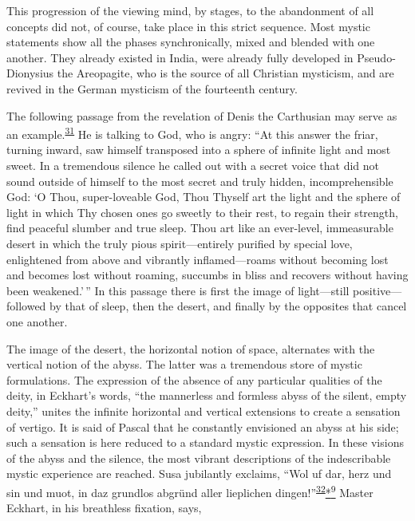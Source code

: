 This progression of the viewing mind, by stages, to the abandonment of
all concepts did not, of course, take place in this strict sequence.
Most mystic statements show all the phases synchronically, mixed and
blended with one another. They already existed in India, were already
fully developed in Pseudo-Dionysius the Areopagite, who is the source of
all Christian mysticism, and are revived in the German mysticism of the
fourteenth century.

The following passage from the revelation of Denis the Carthusian may
serve as an
example.\textsuperscript{\protect\hypertarget{17_Chapter_Ten__THE_FAILURE_OF_IMAG.xhtmlux5cux23id_674}{\protect\hyperlink{23_NOTES.xhtmlux5cux23id_675}{31}}}
He is talking to God, who is angry: ``At this answer the friar, turning
inward, saw himself transposed into a sphere of infinite light and most
sweet. In a tremendous silence he called out with a secret voice that
did not sound outside of himself to the most secret and truly hidden,
incomprehensible God: `O Thou, super-loveable God, Thou Thyself art the
light and the sphere of light in which Thy chosen ones go sweetly to
their rest, to regain their strength, find peaceful slumber and true
sleep. Thou art like an ever-level, immeasurable desert in which the
truly pious spirit---entirely purified by special love, enlightened from
above and vibrantly inflamed---roams without becoming lost and becomes
lost without roaming, succumbs in bliss and recovers without having been
weakened.'\,'' In this passage there is first the image of light---still
positive---followed by that of sleep, then the desert, and finally by
the opposites that cancel one another.

The image of the desert, the horizontal notion of space, alternates with
the vertical notion of the abyss. The latter was a tremendous store of
mystic formulations. The expression of the absence of any particular
qualities of the deity, in Eckhart's words, ``the mannerless and
formless abyss of the silent, empty deity,'' unites the infinite
horizontal and vertical extensions to create a sensation of vertigo. It
is said of Pascal that he constantly envisioned an abyss at his side;
such a sensation is here reduced to a standard mystic
\protect\hypertarget{17_Chapter_Ten__THE_FAILURE_OF_IMAG.xhtmlux5cux23page_259}{}{}expression.
In these visions of the abyss and the silence, the most vibrant
descriptions of the indescribable mystic experience are reached. Susa
jubilantly exclaims, ``Wol uf dar, herz und sin und muot, in daz
grundlos abgründ aller lieplichen
dingen!''\textsuperscript{\protect\hypertarget{17_Chapter_Ten__THE_FAILURE_OF_IMAG.xhtmlux5cux23id_672}{\protect\hyperlink{23_NOTES.xhtmlux5cux23id_673}{32}}}\protect\hypertarget{17_Chapter_Ten__THE_FAILURE_OF_IMAG.xhtmlux5cux23id_2595}{\protect\hyperlink{23_NOTES.xhtmlux5cux23id_2596}{*\textsuperscript{9}}}
Master Eckhart, in his breathless fixation, says,

